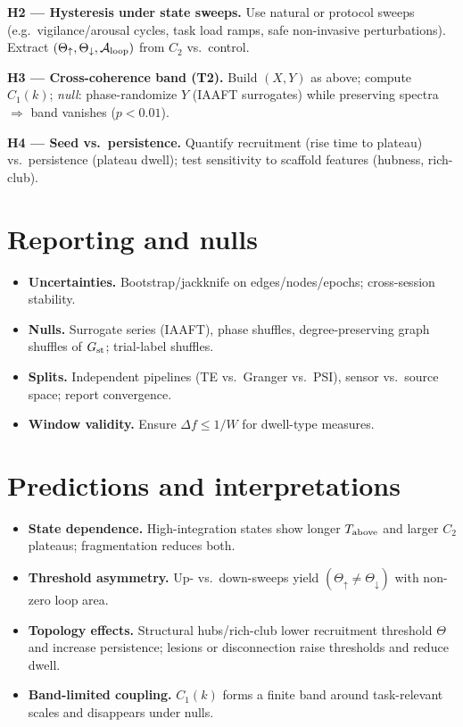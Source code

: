 \documentclass[12pt,a4paper,oneside]{scrreprt}
\begin{document}
\textbf{H2 — Hysteresis under state sweeps.}
Use natural or protocol sweeps (e.g.\ vigilance/arousal cycles, task load ramps, safe non-invasive perturbations). 
Extract $(\Theta_\uparrow,\Theta_\downarrow,\mathcal A_{\rm loop})$ from $C_2$ vs.\ control.

\textbf{H3 — Cross-coherence band (T2).}
Build $(X,Y)$ as above; compute $C_1(k)$; \emph{null}: phase-randomize $Y$ (IAAFT surrogates) while preserving spectra $\Rightarrow$ band vanishes ($p<0.01$).

\textbf{H4 — Seed vs.\ persistence.}
Quantify recruitment (rise time to plateau) vs.\ persistence (plateau dwell); test sensitivity to scaffold features (hubness, rich-club).

\section{Reporting and nulls}\label{sec:human-report}
\begin{itemize}
\item \textbf{Uncertainties.} Bootstrap/jackknife on edges/nodes/epochs; cross-session stability.
\item \textbf{Nulls.} Surrogate series (IAAFT), phase shuffles, degree-preserving graph shuffles of $G_{\rm st}$; trial-label shuffles.
\item \textbf{Splits.} Independent pipelines (TE vs.\ Granger vs.\ PSI), sensor vs.\ source space; report convergence.
\item \textbf{Window validity.} Ensure $\Delta f\le 1/W$ for dwell-type measures.
\end{itemize}

\section{Predictions and interpretations}\label{sec:human-predict}
\begin{itemize}
\item \textbf{State dependence.} High-integration states show longer $T_{\rm above}$ and larger $C_2$ plateaus; fragmentation reduces both.
\item \textbf{Threshold asymmetry.} Up- vs.\ down-sweeps yield $(\Theta_\uparrow\neq\Theta_\downarrow)$ with non-zero loop area.
\item \textbf{Topology effects.} Structural hubs/rich-club lower recruitment threshold $\Theta$ and increase persistence; lesions or disconnection raise thresholds and reduce dwell.
\item \textbf{Band-limited coupling.} $C_1(k)$ forms a finite band around task-relevant scales and disappears under nulls.
\end{itemize}
\end{document}
